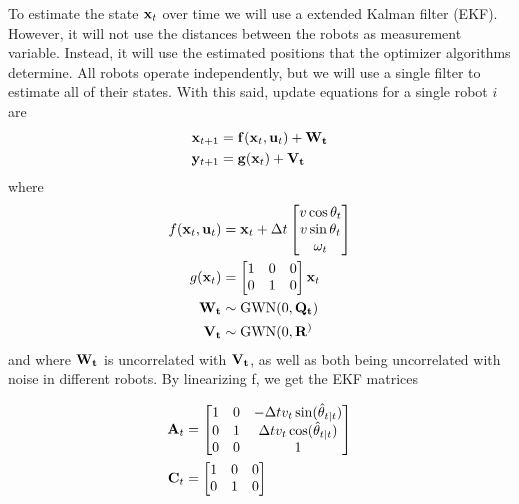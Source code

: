 To estimate the state $\totstate$ over time we will use a extended Kalman filter (EKF). However, it will not use the distances between the robots as measurement variable. Instead, it will use the estimated positions that the optimizer algorithms determine. All robots operate independently, but we will use a single filter to estimate all of their states. With this said, update equations for a single robot $i$ are
\begin{align}
    \totstate[t+1] &= \f(\totstate, \totu) + \W \\
    \totmeas[t+1] &= \g(\totstate) + \V
\end{align}
where
\begin{align}
    f(\totstate, \totu) &= \totstate +\Delta t
    \begin{bmatrix} 
        v \cos \theta_t \\ v \sin \theta_t \\ \omega_t
    \end{bmatrix}\\
    g(\totstate) &= \begin{bmatrix}
        1 & 0 & 0 \\
        0 & 1 & 0
    \end{bmatrix} \totstate \\
    \W &\sim \text{GWN} (0, \Q) \\
    \V &\sim \text{GWN} (0, \R) 
\end{align}
and where $\W$ is uncorrelated with $\V$, as well as both being uncorrelated with noise in different robots. By linearizing f, we get the EKF matrices

\begin{align}
    \A_t &=\begin{bmatrix}
        1 & 0 & -\Delta t v_{t} \sin(\hat{\theta}_{t \mid t}) \\
        0 & 1 & \Delta t v_{t} \cos(\hat{\theta}_{t \mid t}) \\
        0 & 0 & 1
    \end{bmatrix} \\
    \C_t &= \begin{bmatrix}
        1 & 0 & 0 \\
        0 & 1 & 0
    \end{bmatrix}
\end{align}



